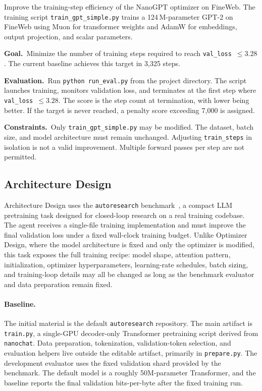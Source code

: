 \begin{promptbox}[title=\textbf{Optimizer Design Task Instruction}]
Improve the training-step efficiency of the NanoGPT optimizer on FineWeb.
The training script \texttt{train\_gpt\_simple.py} trains a 124\,M-parameter
GPT-2 on FineWeb using Muon for transformer weights and AdamW for embeddings,
output projection, and scalar parameters.

\smallskip
\noindent\textbf{Goal.}~Minimize the number of training steps required to
reach \texttt{val\_loss}~$\leq 3.28$.
The current baseline achieves this target in 3{,}325 steps.

\smallskip
\noindent\textbf{Evaluation.}~Run \texttt{python run\_eval.py} from the
project directory.
The script launches training, monitors validation loss, and terminates at the
first step where \texttt{val\_loss}~$\leq 3.28$.
The score is the step count at termination, with lower being better.
If the target is never reached, a penalty score exceeding 7{,}000 is assigned.

\smallskip
\noindent\textbf{Constraints.}~Only \texttt{train\_gpt\_simple.py} may be
modified.
The dataset, batch size, and model architecture must remain unchanged.
Adjusting \texttt{train\_steps} in isolation is not a valid improvement.
Multiple forward passes per step are not permitted.
\end{promptbox}

\subsection{Architecture Design}
\label{app:benchmark-architecture-design}

Architecture Design uses the \texttt{autoresearch} benchmark~\citep{autoresearch},
a compact LLM pretraining task designed for closed-loop research on a real
training codebase.
The agent receives a single-file training implementation and must improve the
final validation loss under a fixed wall-clock training budget.
Unlike Optimizer Design, where the model architecture is fixed and only the
optimizer is modified, this task exposes the full training recipe: model shape,
attention pattern, initialization, optimizer hyperparameters, learning-rate
schedules, batch sizing, and training-loop details may all be changed as long
as the benchmark evaluator and data preparation remain fixed.

\paragraph{Baseline.}
The initial material is the default \texttt{autoresearch} repository.
The main artifact is \texttt{train.py}, a single-GPU decoder-only Transformer
pretraining script derived from \texttt{nanochat}.
Data preparation, tokenization, validation-token selection, and evaluation
helpers live outside the editable artifact, primarily in \texttt{prepare.py}.
The development evaluator uses the fixed validation shard provided by the benchmark.
The default model is a roughly 50M-parameter Transformer, and the baseline
reports the final validation bits-per-byte after the fixed training run.

